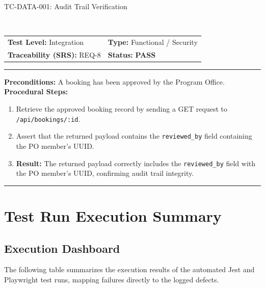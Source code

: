 \documentclass[11pt,a4paper]{article}
\makeatletter
\newcommand{\ieeetestcase}[8]{%
    \needspace{8\baselineskip}
    \noindent\colorbox{primaryblue}{\parbox{\dimexpr\textwidth-2\fboxsep\relax}{
        \color{white}\bfseries\large\strut #1: #2
    }}
    \nopagebreak\\
    \noindent\begin{tabularx}{\textwidth}{@{}X X@{}}
        \textbf{Test Level:} #3 & \textbf{Type:} #4 \\
        \textbf{Traceability (SRS):} #5 & \textbf{Status:} #6 \\
    \end{tabularx}
    \nopagebreak\vspace{0.1cm}
    \nopagebreak\hrule\vspace{0.2cm}
    \noindent\textbf{Preconditions:} #7 \\
    \noindent\textbf{Procedural Steps:}
    \begin{enumerate}[noitemsep,topsep=1pt,leftmargin=0.5cm]
        #8
    \end{enumerate}
    \vspace{0.4cm}\hrule\vspace{0.4cm}
}
\makeatother
\begin{document}
\ieeetestcase{TC-DATA-001}{Audit Trail Verification}{Integration}{Functional / Security}{REQ-8}{\textbf{PASS}}{A booking has been approved by the Program Office.}{
    \item Retrieve the approved booking record by sending a GET request to \texttt{/api/bookings/:id}.
    \item Assert that the returned payload contains the \texttt{reviewed\_by} field containing the PO member's UUID.
    \item \textbf{Result:} The returned payload correctly includes the \texttt{reviewed\_by} field with the PO member's UUID, confirming audit trail integrity.
}

\newpage
\section{Test Run Execution Summary}

\subsection{Execution Dashboard}
The following table summarizes the execution results of the automated Jest and Playwright test runs, mapping failures directly to the logged defects.
\end{document}
